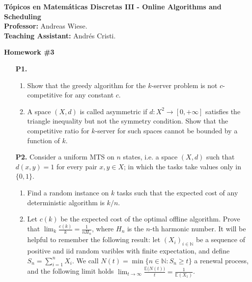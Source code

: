 \documentclass[11pt, spanish]{article}
\theoremstyle{plain}
\newcommand{\N}{\mathds{N}}
\newcommand{\E}{\mathbb{E}}
\begin{document}

\begin{flushleft}
  \textbf{Tópicos en Matemáticas Discretas III - Online Algorithms and Scheduling}
  \\\textbf{Professor:} Andreas Wiese.
  \\\textbf{Teaching Assistant:} Andrés Cristi.
\end{flushleft}


\begin{center}
  \Large{\textbf{Homework \#3}}
\end{center}




\begin{itemize}
  \item[\textbf{P1.}] 
    \begin{enumerate}
      \item Show that the greedy algorithm for the $k$-server problem
	is not $c$-competitive for any constant $c$.
      \item A space $(X,d)$ is called asymmetric if $d:X^2\rightarrow [0,+\infty]$
	satisfies the triangle inequality but not the symmetry condition. Show that
	the competitive ratio for $k$-server for such spaces cannot be bounded
	by a function of $k$.
    \end{enumerate}

  
  \item[\textbf{P2.}] Consider a uniform MTS on $n$ states, i.e. a space $(X,d)$ such
    that $d(x,y)=1$ for every pair $x,y\in X$; in which the tasks take values only in
    $\{0,1\}$.
    \begin{enumerate}
      \item Find a random instance on $k$ tasks such that the expected cost of any
	deterministic algorithm is $k/n$.
      \item Let $c(k)$ be the expected cost of the optimal offline algorithm.
	Prove that $\lim_k \frac{c(k)}{k}= \frac{1}{nH_n}$, where $H_n$ is 
	the $n$-th harmonic number. It will be helpful to remember the following result: let $(X_i)_{i\in\N}$ be a sequence of positive and iid random
	varibles with finite expectation, and define $S_n= \sum_{i=1}^n X_i$.
	We call $N(t)= \min \{ n\in \N: S_n\geq t \}$ a renewal process, and the
	following limit holds $\lim_{t\rightarrow\infty} \frac{\E\big(N(t)\big)}{t}= \frac{1}{\E(X_1)}$.
	

\end{enumerate}
\end{itemize}
\end{document}
